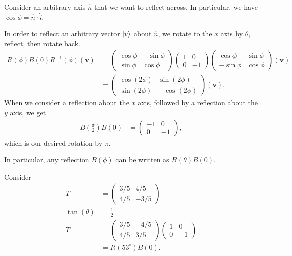 \documentclass[10pt]{mypackage}
\begin{document}
\begin{example}
  Consider an arbitrary axis $\widehat{n}$ that we want to reflect across. In particular, we have $\cos\phi = \widehat{n}\cdot \widehat{i}$.\newline

  In order to reflect an arbitrary vector $\ket{v}$ about $\widehat{n}$, we rotate to the $x$ axis by $\theta$, reflect, then rotate back.
  \begin{align*}
    R\left(\phi\right) B(0) R^{-1}\left(\phi\right)\left(\mathbf{v}\right) &= \begin{pmatrix}\cos\phi & -\sin\phi \\ \sin\phi & \cos\phi\end{pmatrix} \begin{pmatrix}1 & 0 \\ 0 & -1\end{pmatrix} \begin{pmatrix}\cos\phi & \sin\phi \\ -\sin\phi & \cos\phi\end{pmatrix} \left(\mathbf{v}\right)\\
     &= \begin{pmatrix}\cos\left(2\phi\right) & \sin\left(2\phi\right) \\ \sin\left(2\phi\right) & -\cos\left(2\phi\right)\end{pmatrix} \left(\mathbf{v}\right).
  \end{align*}
  When we consider a reflection about the $x$ axis, followed by a reflection about the $y$ axis, we get
  \begin{align*}
    B\left(\frac{\pi}{2}\right) B\left(0\right) &= \begin{pmatrix}-1 & 0 \\ 0 & -1\end{pmatrix},
  \end{align*}
  which is our desired rotation by $\pi$.\newline

  In particular, any reflection $B\left(\phi\right)$ can be written as $R\left(\theta\right)B\left(0\right)$.\newline

  Consider
  \begin{align*}
    T &= \begin{pmatrix}3/5 & 4/5\\ 4/5 & -3/5\end{pmatrix}\\
    \tan\left(\theta\right) &= \frac{1}{2}\\
    T &= \begin{pmatrix}3/5 & -4/5\\4/5 & 3/5\end{pmatrix} \begin{pmatrix}1 & 0 \\ 0 & -1\end{pmatrix}\\
      &= R\left(53^{\circ}\right)B\left(0\right).
  \end{align*}
\end{example}
\end{document}
